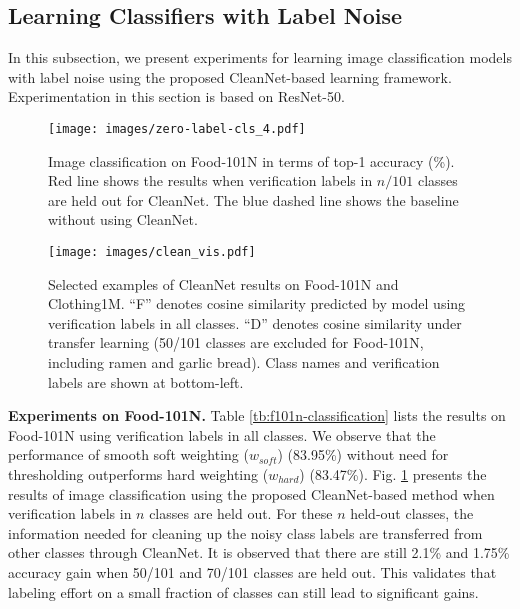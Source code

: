 \documentclass[10pt,twocolumn,letterpaper]{article}
\begin{document}
\subsection{Learning Classifiers with Label Noise}
\label{subsec:image-recognition}
In this subsection, we present experiments for learning image classification models with label noise using the proposed CleanNet-based learning framework. Experimentation in this section is based on ResNet-50.

\begin{figure}[t]
\begin{center}
\texttt{[image: images/zero-label-cls\_4.pdf]}
\end{center}
\caption{Image classification on Food-101N in terms of top-1 accuracy (\%). Red line shows the results when verification labels in $n/101$ classes are held out for CleanNet. The blue dashed line shows the baseline without using CleanNet.}
\label{fig:f101n-da-classification}
\end{figure}



\begin{figure}[t]
\begin{center}
\texttt{[image: images/clean\_vis.pdf]}
\end{center}
\caption{Selected examples of CleanNet results on Food-101N and Clothing1M. ``F'' denotes cosine similarity predicted by model using verification labels in all classes. ``D'' denotes cosine similarity under transfer learning (50/101 classes are excluded for Food-101N, including ramen and garlic bread). Class names and verification labels are shown at bottom-left.}
\label{fig:denoise_vis}
\end{figure}

\noindent
\textbf{Experiments on Food-101N.} 
Table \ref{tb:f101n-classification} lists the results on Food-101N using verification labels in all classes. We observe that the performance of smooth soft weighting ($w_{soft}$) (83.95\%) without need for thresholding outperforms hard weighting ($w_{hard}$) (83.47\%). Fig. \ref{fig:f101n-da-classification} presents the results of image classification using the proposed CleanNet-based method when verification labels in $n$ classes are held out. For these $n$ held-out classes, the information needed for cleaning up the noisy class labels are transferred from other classes through CleanNet. It is observed that there are still 2.1\% and 1.75\% accuracy gain when 50/101 and 70/101 classes are held out. This validates that labeling effort on a small fraction of classes can still lead to significant gains.
\end{document}
